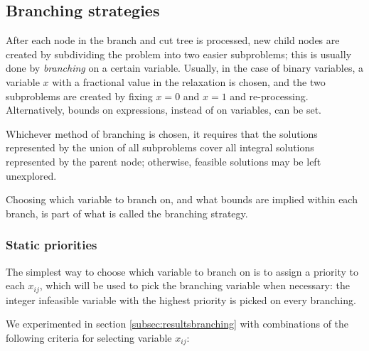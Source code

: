 \subsection{Branching strategies}
\label{subsec:alg:branching}

After each node in the branch and cut tree is processed, new child nodes are created by subdividing the problem into two easier subproblems; this is usually done by \textit{branching} on a certain variable. Usually, in the case of binary variables, a variable $x$ with a fractional value in the relaxation is chosen, and the two subproblems are created by fixing $x = 0$ and $x = 1$ and re-processing. Alternatively, bounds on expressions, instead of on variables, can be set.

\begin{figure}[h]
	\label{fig:branching}
	\centering
\end{figure}

Whichever method of branching is chosen, it requires that the solutions represented by the union of all subproblems cover all integral solutions represented by the parent node; otherwise, feasible solutions may be left unexplored.

Choosing which variable to branch on, and what bounds are implied within each branch, is part of what is called the branching strategy. 

\subsubsection*{Static priorities}

The simplest way to choose which variable to branch on is to assign a priority to each $x_{ij}$, which will be used to pick the branching variable when necessary: the integer infeasible variable with the highest priority is picked on every branching. 

We experimented in section \ref{subsec:resultsbranching} with combinations of the following criteria for selecting variable $x_{ij}$:

